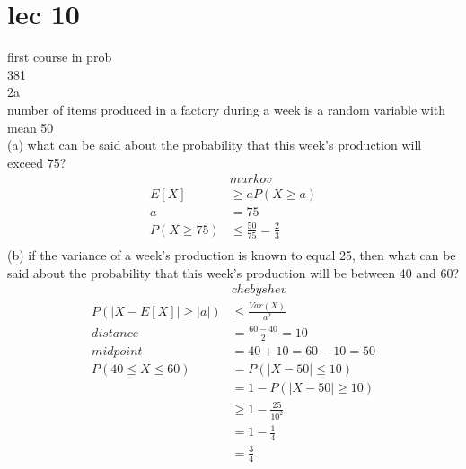\documentclass[12pt,border=4pt,multi]{article} %
\begin{document}
\section*{lec 10}
first course in prob\\
381\\
2a\\
number of items produced in a factory during a week is a random variable with mean 50\\
(a) what can be said about the probability that this week’s production will
exceed 75?
\begin{align*}
&markov\\
E[X] &\geq aP(X \geq a)\\
a &= 75\\
P(X \geq 75) &\leq \frac{50}{75} = \frac{2}{3}\\
\end{align*}
(b) if the variance of a week’s production is known to equal 25, then what can
be said about the probability that this week’s production will be between 40
and 60?
\begin{align*}
&chebyshev\\
P(|X - E[X]| \geq |a|) &\leq \frac{Var(X)}{a^2}\\
distance &= \frac{60 - 40}{2} = 10\\
midpoint &= 40 + 10 = 60 - 10 = 50\\
P(40 \leq X \leq 60) &= P(|X - 50| \leq 10)\\ 
&= 1 - P(|X - 50| \geq 10)\\
&\geq 1 - \frac{25}{10^2}\\
&= 1 - \frac{1}{4}\\
&= \frac{3}{4}\\
\end{align*}
\end{document}
